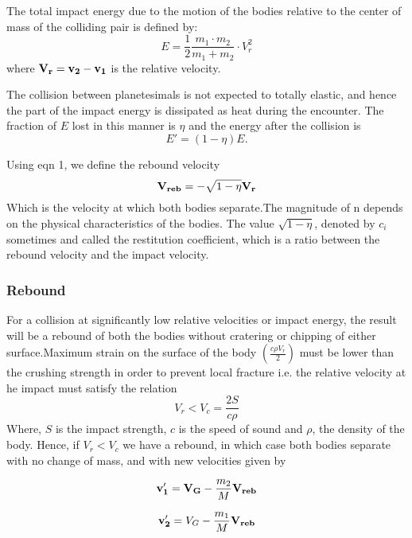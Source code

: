 The total impact energy due to the motion of the bodies relative to the center of mass of the colliding pair is defined by: \
\begin{equation}
E = \frac{1}{2} \frac {m_{1}\cdot m_{2}} {m_{1}+m_{2}}\cdot V_{r}^{2}
\end{equation}  
where ${\bf V_{r}} = \bf v_{2}-v_{1}$ is the relative velocity.

The collision between planetesimals is not expected to totally elastic, and hence the part of the impact energy is dissipated as heat during the encounter. The fraction of $E$ lost in this manner is $\eta$ and the energy after the collision is 
\begin{equation}
E' = (1-\eta)E.
\end{equation}

Using eqn 1, we define the rebound velocity 
\begin{equation}
{\bf V_{reb}} = -\sqrt{1-\eta}{\bf V_{r}}
\end{equation} 
Which is the velocity at which both bodies separate.The magnitude of n depends on the physical characteristics of the bodies. The value $\sqrt{1-\eta}$, denoted by $c_{i}$ sometimes and called the restitution coefficient, which is a ratio between the rebound velocity and the impact velocity.

\subsubsection{Rebound}
For a collision at significantly low relative velocities or impact energy, the result will be a rebound of both the bodies without cratering or chipping of either surface.Maximum strain on the surface of the body $(\frac{c \rho V_{r}}{2})$ must be lower than the crushing strength in order to prevent local fracture i.e. the relative velocity at he impact must satisfy the relation 
\begin{equation}
V_{r}<V_{c} = \frac{2 S}{c \rho}
\end{equation}
Where, $S$ is the impact strength, $c$ is the speed of sound and $\rho$, the density of the body. Hence, if $V_{r}<V_{c}$ we have a rebound, in which case both bodies separate with no change of mass, and with new velocities given by

\begin{equation}
{\bf v'_{1}}= {\bf V_{G}}-\frac {m_{2}}{M}{\bf V_{reb}}
\end{equation}

\begin{equation}
{\bf v'_{2}} = V_{G}-\frac{m_{1}}{M}{\bf V_{reb}}
\end{equation}

